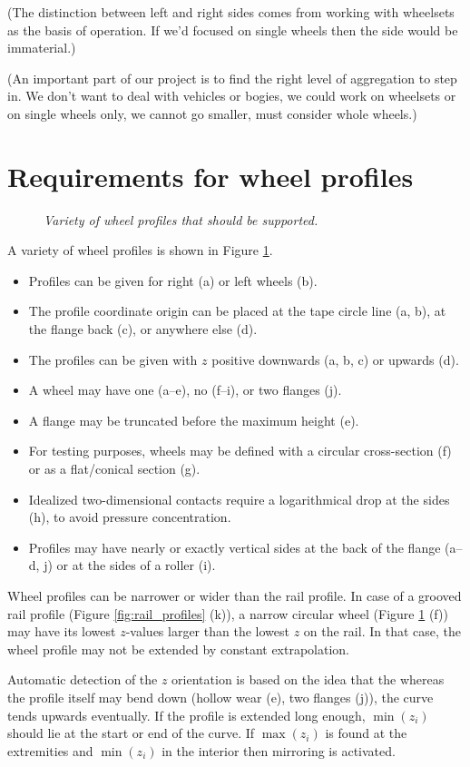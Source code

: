 \documentclass[12pt]{report}
\begin{document}
{(The distinction between left and right sides comes from working with
wheelsets as the basis of operation. If we'd focused on single wheels then
the side would be immaterial.)

(An important part of our project is to find the right level of
aggregation to step in. We don't want to deal with vehicles or bogies, we
could work on wheelsets or on single wheels only, we cannot go smaller,
must consider whole wheels.)

\section{Requirements for wheel profiles}

\begin{figure}[bt]
\centering
{}
\caption{\em Variety of wheel profiles that should be supported.}
\label{fig:wheel_profiles}
\end{figure}

A variety of wheel profiles is shown in Figure \ref{fig:wheel_profiles}.
\begin{itemize}
\item Profiles can be given for right (a) or left wheels (b).
\item The profile coordinate origin can be placed at the tape circle line
        (a, b), at the flange back (c), or anywhere else (d).
\item The profiles can be given with $z$ positive downwards (a, b, c) or
        upwards (d).
\item A wheel may have one (a--e), no (f--i), or two flanges (j).
\item A flange may be truncated before the maximum height (e).
\item For testing purposes, wheels may be defined with a circular
        cross-section (f) or as a flat/conical section (g).
\item Idealized two-dimensional contacts require a logarithmical drop at
        the sides (h), to avoid pressure concentration.
\item Profiles may have nearly or exactly vertical sides at the back of
        the flange (a--d, j) or at the sides of a roller (i).
\end{itemize}
Wheel profiles can be narrower or wider than the rail profile. In case of a
grooved rail profile (Figure \ref{fig:rail_profiles} (k)), a narrow
circular wheel (Figure \ref{fig:wheel_profiles} (f)) may have its lowest
$z$-values larger than the lowest $z$ on the rail. In that case, the wheel
profile may not be extended by constant extrapolation.

Automatic detection of the $z$ orientation is based on the idea that the
whereas the profile itself may bend down (hollow wear (e), two flanges
(j)), the curve tends upwards eventually. If the profile is
extended long enough, $\min(z_i)$ should lie at the start or end of the
curve. If $\max(z_i)$ is found at the extremities and $\min(z_i)$ in the
interior then mirroring is activated.
}
\end{document}
